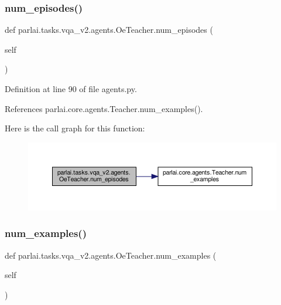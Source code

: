 \subsubsection{\texorpdfstring{num\+\_\+episodes()}{num\_episodes()}}
{\footnotesize\ttfamily def parlai.\+tasks.\+vqa\+\_\+v2.\+agents.\+Oe\+Teacher.\+num\+\_\+episodes (\begin{DoxyParamCaption}\item[{}]{self }\end{DoxyParamCaption})}



Definition at line 90 of file agents.\+py.



References parlai.\+core.\+agents.\+Teacher.\+num\+\_\+examples().

Here is the call graph for this function\+:
\nopagebreak
\begin{figure}[H]
\begin{center}
\leavevmode
\includegraphics[width=350pt]{classparlai_1_1tasks_1_1vqa__v2_1_1agents_1_1OeTeacher_a98b9f8bc131ddb23d185811a479dc742_cgraph}
\end{center}
\end{figure}
\mbox{\label{classparlai_1_1tasks_1_1vqa__v2_1_1agents_1_1OeTeacher_a1285cd818eafe9267f54049cc77d9506}} 
\subsubsection{\texorpdfstring{num\+\_\+examples()}{num\_examples()}}
{\footnotesize\ttfamily def parlai.\+tasks.\+vqa\+\_\+v2.\+agents.\+Oe\+Teacher.\+num\+\_\+examples (\begin{DoxyParamCaption}\item[{}]{self }\end{DoxyParamCaption})}




